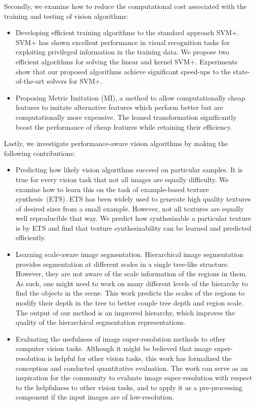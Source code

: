 Secondly, we examine how to reduce the computational cost associated with the training and testing of vision algorithms:  
\begin{itemize}
\item Developing efficient training algorithms to the standard approach SVM+.   SVM+ has shown excellent performance in visual recognition tasks for exploiting privileged information in the
  training data.   We propose two efficient algorithms
  for solving the linear and kernel SVM+. 
    Experiments show that our proposed algorithms achieve significant
  speed-ups to  the state-of-the-art solvers for  SVM+.
  
\item Proposing Metric Imitation (MI), a method to allow computationally cheap features to imitate alternative features which perform better but are computationally more expensive.   The leaned transformation significantly boost the performance of cheap features while retaining their efficiency.  
\end{itemize}

Lastly, we investigate performance-aware vision algorithms by making the following contributions:  
\begin{itemize}
\item  Predicting how likely vision algorithms succeed on particular samples.  It is true for every vision task that not all images are equally difficulty. We examine how to learn this on the task of example-based texture synthesis~(ETS). ETS has been widely used to
  generate high quality textures of desired sizes from a small
  example. However, not all textures are equally well reproducible
  that way. We predict how synthesizable a particular texture
  is by ETS and find that texture synthesizability can be learned and predicted efficiently. 

\item  Learning scale-aware image segmentation.
Hierarchical image segmentation provides segmentation at different scales in a single tree-like structure.
However, they are not aware of the scale information of the regions in them.
As such, one might need to work on many different levels of the hierarchy to find the objects in the scene.
This work predicts the scales of the regions to modify their depth in the tree to better couple tree depth and region scale.
The output of our method is an improved hierarchy, which improves the quality of the hierarchical segmentation representations.

\item  Evaluating the usefulness of image super-resolution methods to other computer vision tasks. Although it might be believed that image super-resolution is helpful for other vision tasks, this work has formalized the conception and conducted quantitative evaluation.
The work can serve as an inspiration for the community  to evaluate image super-resolution with respect to the helpfulness to other vision tasks, and to apply it as a pre-processing component if the input images are of low-resolution. 
\end{itemize}


